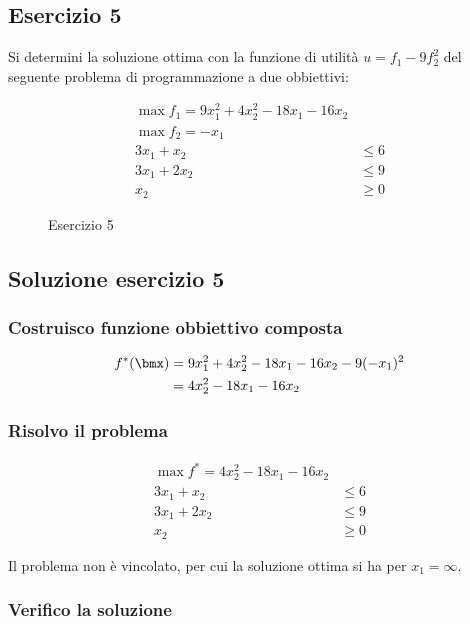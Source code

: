 \documentclass[\main/main.tex]{subfiles}
\begin{document}
\subsection{Esercizio 5}
Si determini la soluzione ottima con la funzione di utilità $u = f_1 - 9f_2^2$ del seguente problema di programmazione a due obbiettivi:

\begin{figure}
  \begin{align*}
    \max f_1 = 9x_1^2 + 4x_2^2 - 18x_1 - 16x_2 \\
    \max f_2 = -x_1                            \\
    3x_1 + x_2  & \leq 6                       \\
    3x_1 + 2x_2 & \leq 9                       \\
    x_2         & \geq 0
  \end{align*}
  \caption{Esercizio 5}
\end{figure}

\subsection{Soluzione esercizio 5}
\subsubsection*{Costruisco funzione obbiettivo composta}
\begin{align*}
  f^*(\bmx) & = 9x_1^2 + 4x_2^2 - 18x_1 - 16x_2 - 9(-x_1)^2 \\
            & = 4x_2^2 - 18x_1 - 16x_2
\end{align*}
\subsubsection*{Risolvo il problema}
\begin{align*}
  \max f^* = 4x_2^2 - 18x_1 - 16x_2 \\
  3x_1 + x_2  & \leq 6              \\
  3x_1 + 2x_2 & \leq 9              \\
  x_2         & \geq 0
\end{align*}

Il problema non è vincolato, per cui la soluzione ottima si ha per $x_1 = \infty$.

\subsubsection*{Verifico la soluzione}
\end{document}
